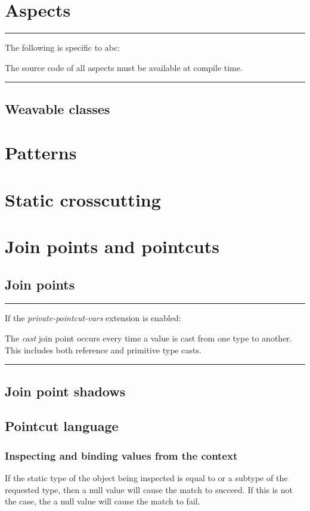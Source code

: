 \documentclass[12pt,a4paper]{report}
\newcommand\extensionbegin[1]{%
\begin{extension:#1}
\hrule
\noindent
If the {\em #1} extension is enabled:

\noindent
}
\newcommand\extensionend[1]{%
\hrule
\end{extension:#1}}
\newcommand\abcdistinctionbegin[0]{%
\hrule
\noindent
The following is specific to abc:

\noindent
}
\newcommand\abcdistinctionend[0]{%
\hrule
}
\begin{document}
\chapter{Aspects}

\abcdistinctionbegin
The source code of all aspects must be available at compile time.
\abcdistinctionend

\section{Weavable classes}

\chapter{Patterns}

\chapter{Static crosscutting}

\chapter{Join points and pointcuts}
\section{Join points}

\extensionbegin{private-pointcut-vars}
The {\em cast} join point occurs every time a value is cast from one type
to another. This includes both reference and primitive type casts.
\extensionend{private-pointcut-vars}

\section{Join point shadows}

\section{Pointcut language}

\subsection{Inspecting and binding values from the context}

If the static type of the object being inspected is equal to or a subtype of
the requested type, then a null value will cause the match to succeed.
If this is not the case, the a null value will cause the match to fail.
\end{document}

